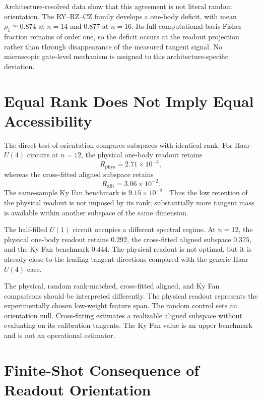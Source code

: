 Architecture-resolved data show that this agreement is not literal random orientation. The RY--RZ--CZ family develops a one-body deficit, with mean $\rho_1\simeq0.874$ at $n=14$ and $0.877$ at $n=16$. Its full computational-basis Fisher fraction remains of order one, so the deficit occurs at the readout projection rather than through disappearance of the measured tangent signal. No microscopic gate-level mechanism is assigned to this architecture-specific deviation.

\section{Equal Rank Does Not Imply Equal Accessibility}

The direct test of orientation compares subspaces with identical rank. For Haar-$U(4)$ circuits at $n=12$, the physical one-body readout retains
\begin{equation}
 R_{\mathrm{phys}}=2.71\times10^{-3},
\end{equation}
whereas the cross-fitted aligned subspace retains
\begin{equation}
 R_{\mathrm{xfit}}=3.06\times10^{-2}.
\end{equation}
The same-sample Ky Fan benchmark is $9.15\times10^{-2}$ \cite{AitHaddou2026MeasurementAccessible}. Thus the low retention of the physical readout is not imposed by its rank; substantially more tangent mass is available within another subspace of the same dimension.

The half-filled $U(1)$ circuit occupies a different spectral regime. At $n=12$, the physical one-body readout retains $0.292$, the cross-fitted aligned subspace $0.375$, and the Ky Fan benchmark $0.444$. The physical readout is not optimal, but it is already close to the leading tangent directions compared with the generic Haar-$U(4)$ case.

The physical, random rank-matched, cross-fitted aligned, and Ky Fan comparisons should be interpreted differently. The physical readout represents the experimentally chosen low-weight feature span. The random control sets an orientation null. Cross-fitting estimates a realizable aligned subspace without evaluating on its calibration tangents. The Ky Fan value is an upper benchmark and is not an operational estimator.

\section{Finite-Shot Consequence of Readout Orientation}

